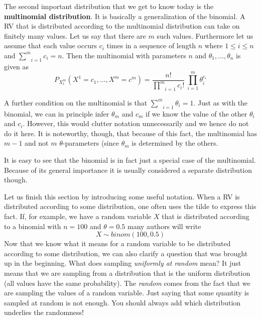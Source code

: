 \documentclass[a4paper,11pt,leqno]{report}
\begin{document}
The second important distribution that we get to know today is the \textbf{multinomial distribution}. It is basically a generalization
of the binomial. A RV that is distributed according to the multinomial distribution can take on finitely many values. Let us say that
there are $ m $ such values. Furthermore let us assume that each value occurs $ c_{i} $ times in a sequence of length $ n $ where
$ 1 \leq i \leq n $ and $ \underset{i=1}{\overset{m}{\sum}}c_{i} = n $. Then the multinomial with parameters $ n $ and 
$ \theta_{1}, \ldots, \theta_{n} $ is given as 
\begin{equation}
P_{X_{1}^{m}}(X^{1}=c_{1}, \ldots, X^{m}=c^{m}) = \dfrac{n!}{\underset{i=1}{\overset{m}{\prod}}c_{i}!}~\underset{i=1}{\overset{m}{\prod}} \theta_{i}^{c_{i}}
\end{equation}

A further condition on the multinomial is that $ \underset{i=1}{\overset{m}{\sum}}\theta_{i} = 1 $. Just as with the binomial, we can
in principle infer $ \theta_{m} $ and $ c_{m} $ if we know the value of the other $ \theta_{i} $ and $ c_{i} $. However, this would
clutter notation unnecessarily and we hence do not do it here. It is noteworthy, though, that because of this fact, the multinomial
has $ m-1 $ and not $ m $ $ \theta $-parameters (since $ \theta_{m} $ is determined by the others.

It is easy to see that the binomial is in fact just a special case of the multinomial. Because of its general importance it is usually
considered a separate distribution though.

Let us finish this section by introducing some useful notation. When a RV is distributed according to some distribution, one often uses
the tilde to express this fact. If, for example, we have a random variable $ X $ that is distributed according to a binomial with $ n=100 $
and $ \theta = 0.5 $ many authors will write
$$ X \sim binom(100, 0.5) $$
Now that we know what it means for a random variable to be distributed according to some distribution, we can also clarify a question 
that was brought up in the beginning. What does sampling \textit{uniformly at random} mean? It just means that we are sampling from
a distribution that is the uniform distribution (all values have the same probability). The \textit{random} comes from the fact that
we are sampling the values of a random variable. Just saying that some quantity is sampled at random is not enough. You should
always add which distribution underlies the randomness!
\end{document}
